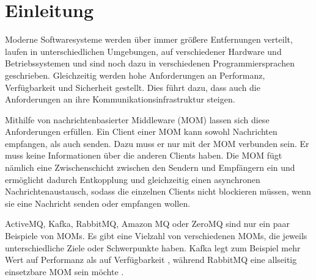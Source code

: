 
\chapter{Einleitung}
\label{ch:Introduction}
Moderne Softwaresysteme werden über immer größere Entfernungen verteilt, laufen in unterschiedlichen Umgebungen, auf verschiedener Hardware und Betriebssystemen und sind noch dazu in verschiedenen Programmiersprachen geschrieben. Gleichzeitig werden hohe Anforderungen an Performanz, Verfügbarkeit und Sicherheit gestellt. Dies führt dazu, dass auch die Anforderungen an ihre Kommunikationsinfrastruktur steigen. \par
Mithilfe von nachrichtenbasierter Middleware (MOM) lassen sich diese Anforderungen erfüllen. Ein Client einer MOM kann sowohl Nachrichten empfangen, als auch senden. Dazu muss er nur mit der MOM verbunden sein. Er muss keine Informationen über die anderen Clients haben. Die MOM fügt nämlich eine Zwischenschicht zwischen den Sendern und Empfängern ein und ermöglicht dadurch Entkopplung und gleichzeitig einen asynchronen Nachrichtenaustausch, sodass die einzelnen Clients nicht blockieren müssen, wenn sie eine Nachricht senden oder empfangen wollen. \par
ActiveMQ, Kafka, RabbitMQ, Amazon MQ oder ZeroMQ sind nur ein paar Beispiele von MOMs. Es gibt eine Vielzahl von verschiedenen MOMs, die jeweils unterschiedliche Ziele oder Schwerpunkte haben. Kafka legt zum Beispiel mehr Wert auf Performanz als auf Verfügbarkeit \cite{kafka}, während RabbitMQ eine allseitig einsetzbare MOM sein möchte \cite{rabbitmq}. \par
